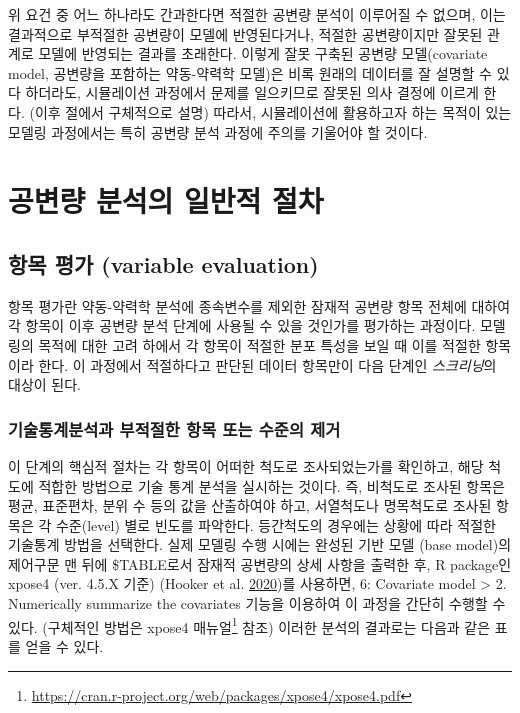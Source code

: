 \documentclass[
  11pt,
  krantz2,
  a4paper]{krantz}
\theoremstyle{definition}
\theoremstyle{definition}
\theoremstyle{definition}
\theoremstyle{remark}
\begin{document}
위 요건 중 어느 하나라도 간과한다면 적절한 공변량 분석이 이루어질 수 없으며, 이는 결과적으로 부적절한 공변량이 모델에 반영된다거나, 적절한 공변량이지만 잘못된 관계로 모델에 반영되는 결과를 초래한다. 이렇게 잘못 구축된 공변량 모델(covariate model, 공변량을 포함하는 약동-약력학 모델)은 비록 원래의 데이터를 잘 설명할 수 있다 하더라도, 시뮬레이션 과정에서 문제를 일으키므로 잘못된 의사 결정에 이르게 한다. (이후 절에서 구체적으로 설명) 따라서, 시뮬레이션에 활용하고자 하는 목적이 있는 모델링 과정에서는 특히 공변량 분석 과정에 주의를 기울어야 할 것이다.

\hypertarget{uxacf5uxbcc0uxb7c9-uxbd84uxc11duxc758-uxc77cuxbc18uxc801-uxc808uxcc28}{%
\section{공변량 분석의 일반적 절차}\label{uxacf5uxbcc0uxb7c9-uxbd84uxc11duxc758-uxc77cuxbc18uxc801-uxc808uxcc28}}

\hypertarget{variable-eval}{%
\subsection{항목 평가 (variable evaluation)}\label{variable-eval}}

항목 평가란 약동-약력학 분석에 종속변수를 제외한 잠재적 공변량 항목 전체에 대하여 각 항목이 이후 공변량 분석 단계에 사용될 수 있을 것인가를 평가하는 과정이다. 모델링의 목적에 대한 고려 하에서 각 항목이 적절한 분포 특성을 보일 때 이를 적절한 항목이라 한다. 이 과정에서 적절하다고 판단된 데이터 항목만이 다음 단계인 \emph{스크리닝}의 대상이 된다.

\hypertarget{uxae30uxc220uxd1b5uxacc4uxbd84uxc11duxacfc-uxbd80uxc801uxc808uxd55c-uxd56duxbaa9-uxb610uxb294-uxc218uxc900uxc758-uxc81cuxac70}{%
\subsubsection{기술통계분석과 부적절한 항목 또는 수준의 제거}\label{uxae30uxc220uxd1b5uxacc4uxbd84uxc11duxacfc-uxbd80uxc801uxc808uxd55c-uxd56duxbaa9-uxb610uxb294-uxc218uxc900uxc758-uxc81cuxac70}}

이 단계의 핵심적 절차는 각 항목이 어떠한 척도로 조사되었는가를 확인하고, 해당 척도에 적합한 방법으로 기술 통계 분석을 실시하는 것이다. 즉, 비척도로 조사된 항목은 평균, 표준편차, 분위 수 등의 값을 산출하여야 하고, 서열척도나 명목척도로 조사된 항목은 각 수준(level) 별로 빈도를 파악한다. 등간척도의 경우에는 상황에 따라 적절한 기술통계 방법을 선택한다. 실제 모델링 수행 시에는 완성된 기반 모델 (base model)의 제어구문 맨 뒤에 \$TABLE로서 잠재적 공변량의 상세 사항을 출력한 후, R package인 xpose4 (ver. 4.5.X 기준) (Hooker et al. \protect\hyperlink{ref-R-xpose4}{2020})를 사용하면, 6: Covariate model \textgreater{} 2. Numerically summarize the covariates 기능을 이용하여 이 과정을 간단히 수행할 수 있다. (구체적인 방법은 xpose4 매뉴얼\footnote{\url{https://cran.r-project.org/web/packages/xpose4/xpose4.pdf}} 참조) 이러한 분석의 결과로는 다음과 같은 표를 얻을 수 있다.
\end{document}
